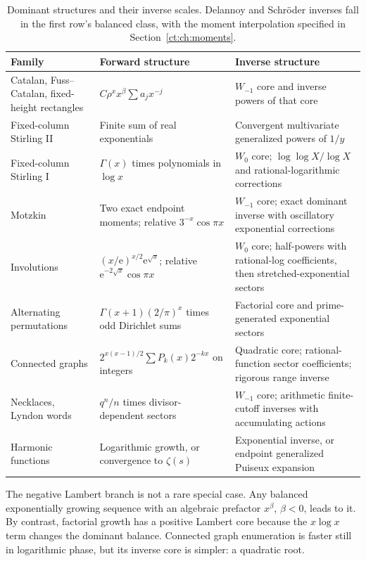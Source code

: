 \documentclass[11pt,openany]{book}
\numberwithin{equation}{chapter}
\theoremstyle{plain}
\theoremstyle{definition}
\theoremstyle{remark}
\newcommand{\ee}{\mathrm e}
\begin{document}
\begin{table}[htbp]
\centering
\small
\renewcommand{\arraystretch}{1.25}
\begin{tabular}{P{34mm}P{46mm}P{64mm}}
\toprule
Family & Forward structure & Inverse structure\\\midrule
Catalan, Fuss--Catalan, fixed-height rectangles
 & $C\rho^x x^\beta\sum a_jx^{-j}$
 & $W_{-1}$ core and inverse powers of that core\\
Fixed-column Stirling II
 & Finite sum of real exponentials
 & Convergent multivariate generalized powers of $1/y$\\
Fixed-column Stirling I
 & $\Gamma(x)$ times polynomials in $\log x$
 & $W_0$ core; $\log\log X/\log X$ and rational-logarithmic corrections\\
Motzkin
 & Two exact endpoint moments; relative $3^{-x}\cos\pi x$
 & $W_{-1}$ core; exact dominant inverse with oscillatory exponential corrections\\
Involutions
 & $(x/\ee)^{x/2}\ee^{\sqrt x}$; relative $\ee^{-2\sqrt x}\cos\pi x$
 & $W_0$ core; half-powers with rational-log coefficients, then stretched-exponential sectors\\
Alternating permutations
 & $\Gamma(x+1)(2/\pi)^x$ times odd Dirichlet sums
 & Factorial core and prime-generated exponential sectors\\
Connected graphs
 & $2^{x(x-1)/2}\sum P_k(x)2^{-kx}$ on integers
 & Quadratic core; rational-function sector coefficients; rigorous range inverse\\
Necklaces, Lyndon words
 & $q^n/n$ times divisor-dependent sectors
 & $W_{-1}$ core; arithmetic finite-cutoff inverses with accumulating actions\\
Harmonic functions
 & Logarithmic growth, or convergence to $\zeta(s)$
 & Exponential inverse, or endpoint generalized Puiseux expansion\\
\bottomrule
\end{tabular}
\caption{Dominant structures and their inverse scales. Delannoy and Schr\"oder inverses fall in the first row's balanced class, with the moment interpolation specified in Section~\ref{ct:ch:moments}.}
\label{t2:tab:classes}
\end{table}

The negative Lambert branch is not a rare special case. Any balanced exponentially growing sequence with an algebraic prefactor $x^\beta$, $\beta<0$, leads to it. By contrast, factorial growth has a positive Lambert core because the $x\log x$ term changes the dominant balance. Connected graph enumeration is faster still in logarithmic phase, but its inverse core is simpler: a quadratic root.
\end{document}
